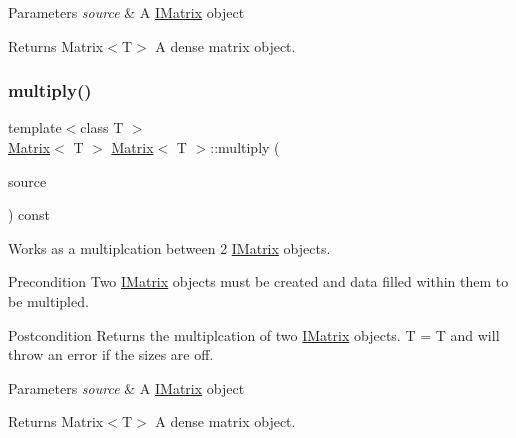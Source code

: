 \begin{DoxyParams}{Parameters}
{\em source} & A \mbox{\hyperlink{class_i_matrix}{I\+Matrix}} object \\
\hline
\end{DoxyParams}
\begin{DoxyReturn}{Returns}
Matrix$<$\+T$>$ A dense matrix object. 
\end{DoxyReturn}
\mbox{\label{class_matrix_afc5e3f929ee180c1f285999c2338ff0c}} 
\subsubsection{\texorpdfstring{multiply()}{multiply()}\hspace{0.1cm}{\footnotesize\ttfamily [6/6]}}
{\footnotesize\ttfamily template$<$class T $>$ \\
\mbox{\hyperlink{class_matrix}{Matrix}}$<$ T $>$ \mbox{\hyperlink{class_matrix}{Matrix}}$<$ T $>$\+::multiply (\begin{DoxyParamCaption}\item[{const \mbox{\hyperlink{class_i_matrix}{I\+Matrix}}$<$ \mbox{\hyperlink{class_d_matrix}{D\+Matrix}}$<$ T $>$, T $>$ \&}]{source }\end{DoxyParamCaption}) const}



Works as a multiplcation between 2 \mbox{\hyperlink{class_i_matrix}{I\+Matrix}} objects. 

\begin{DoxyPrecond}{Precondition}
Two \mbox{\hyperlink{class_i_matrix}{I\+Matrix}} objects must be created and data filled within them to be multipled. 
\end{DoxyPrecond}
\begin{DoxyPostcond}{Postcondition}
Returns the multiplcation of two \mbox{\hyperlink{class_i_matrix}{I\+Matrix}} objects. T = T and will throw an error if the sizes are off.
\end{DoxyPostcond}

\begin{DoxyParams}{Parameters}
{\em source} & A \mbox{\hyperlink{class_i_matrix}{I\+Matrix}} object \\
\hline
\end{DoxyParams}
\begin{DoxyReturn}{Returns}
Matrix$<$\+T$>$ A dense matrix object. 
\end{DoxyReturn}
\mbox{\label{class_matrix_a9b987f07fb3d4fcf2b038cbfd6615650}} 
